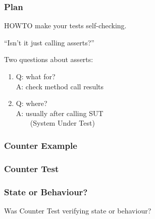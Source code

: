\documentclass{beamer}
\newenvironment{changemargin}[1]{%
  \begin{list}{}{%
    \setlength{\topsep}{0pt}%
    \setlength{\leftmargin}{#1}%
    \setlength{\rightmargin}{1em}
    \setlength{\listparindent}{\parindent}%
    \setlength{\itemindent}{\parindent}%
    \setlength{\parsep}{\parskip}%
  }%
  \item[]}{\end{list}}
\begin{document}
\begin{frame}
  \frametitle{Plan}

  \Large
  \begin{changemargin}{1cm}
    HOWTO make your tests self-checking.
  \end{changemargin}
\end{frame}

\begin{frame}
  \Large
  \begin{changemargin}{2cm}
    ``Isn't it just calling asserts?''\\[1em]
  \end{changemargin}
\end{frame}

\begin{frame}
  \Large
  \begin{changemargin}{2cm}
    Two questions about asserts:
    \begin{enumerate}
    \item Q: what for?\\
      A: check method call results\\[1em]
    \item Q: where?\\
      A: usually after calling SUT \\ ~~~~(System Under Test)
    \end{enumerate}
  \end{changemargin}
\end{frame}

\begin{frame}
  \frametitle{Counter Example}

  \begin{changemargin}{0.5cm}
    
  \end{changemargin}
\end{frame}

\begin{frame}
  \frametitle{Counter Test}

  \begin{changemargin}{0.5cm}
    
  \end{changemargin}
\end{frame}

\begin{frame}
  \frametitle{State or Behaviour?}

  \begin{changemargin}{2cm}
    Was Counter Test verifying state or behaviour?
  \end{changemargin}
\end{frame}
\end{document}
